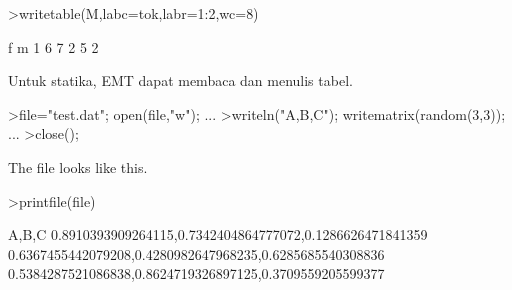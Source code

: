 \documentclass[a4paper,10pt]{article}
\begin{document}
\begin{eulernotebook}
\begin{eulercomment}
\begin{eulercomment}
\begin{eulercomment}
\begin{eulercomment}
\begin{eulercomment}
\begin{eulercomment}
\begin{eulercomment}
\begin{eulercomment}
\begin{eulercomment}
\begin{eulercomment}
\begin{eulercomment}
\begin{eulercomment}
\begin{eulercomment}
\begin{eulercomment}
\begin{eulerprompt}
>writetable(M,labc=tok,labr=1:2,wc=8)
\end{eulerprompt}
\begin{euleroutput}
                 f       m
         1       6       7
         2       5       2
\end{euleroutput}
\begin{eulercomment}
Untuk statika, EMT dapat membaca dan menulis tabel.
\end{eulercomment}
\begin{eulerprompt}
>file="test.dat"; open(file,"w"); ...
>writeln("A,B,C"); writematrix(random(3,3)); ...
>close();
\end{eulerprompt}
\begin{eulercomment}
The file looks like this.
\end{eulercomment}
\begin{eulerprompt}
>printfile(file)
\end{eulerprompt}
\begin{euleroutput}
  A,B,C
  0.8910393909264115,0.7342404864777072,0.1286626471841359
  0.6367455442079208,0.4280982647968235,0.6285685540308836
  0.5384287521086838,0.8624719326897125,0.3709559205599377
  

\end{euleroutput}
\end{eulercomment}
\end{eulercomment}
\end{eulercomment}
\end{eulercomment}
\end{eulercomment}
\end{eulercomment}
\end{eulercomment}
\end{eulercomment}
\end{eulercomment}
\end{eulercomment}
\end{eulercomment}
\end{eulercomment}
\end{eulercomment}
\end{eulercomment}
\end{eulernotebook}
\end{document}

